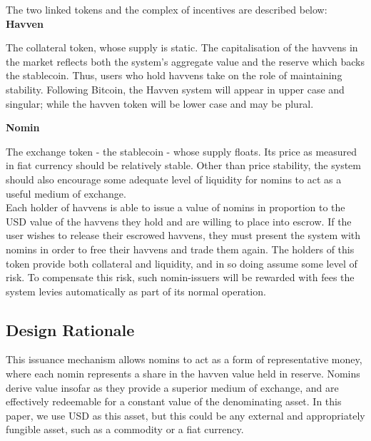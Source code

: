 \noindent The two linked tokens and the complex of incentives are described below: \\

\noindent \textbf{Havven}

\vspace{1mm}

\noindent The collateral token, whose supply is static.
The capitalisation of the havvens in the market reflects both the system's aggregate value and the reserve
which backs the stablecoin. Thus, users who hold havvens take on the role of maintaining stability.
Following Bitcoin, the Havven system will appear in upper case and singular; while the havven
token will be lower case and may be plural.

\vspace{2mm}

\noindent \textbf{Nomin}

\vspace{1mm}

\noindent The exchange token - the stablecoin - whose supply floats.
Its price as measured in fiat currency should be relatively stable.
Other than price stability, the system should also encourage some adequate level
of liquidity for nomins to act as a useful medium of exchange. \\

\noindent Each holder of havvens is able to issue a value of nomins in proportion to the USD value
of the havvens they hold and are willing to place into escrow. If the user wishes to release their escrowed havvens, they must
present the system with nomins in order to free their havvens and trade them again.
The holders of this token provide both collateral and liquidity, and in so doing assume some
level of risk. To compensate this risk, such nomin-issuers will be rewarded with fees the system levies
automatically as part of its normal operation. \\

\subsection{Design Rationale}

\noindent This issuance mechanism allows nomins to act as a form of representative money, where 
each nomin represents a share in the havven value held in reserve. Nomins derive value insofar as they provide
a superior medium of exchange, and are effectively redeemable for a constant value
of the denominating asset. In this paper, we use USD as this asset, but this could be any external
and appropriately fungible asset, such as a commodity or a fiat currency.  \\


